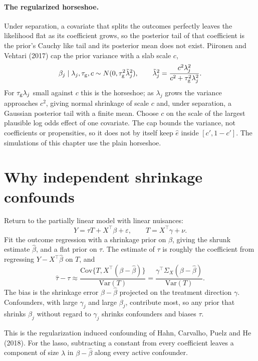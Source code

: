 \paragraph{The regularized horseshoe.} Under separation, a covariate that splits the outcomes perfectly leaves the likelihood flat as its coefficient grows, so the posterior tail of that coefficient is the prior's Cauchy like tail and its posterior mean does not exist. Piironen and Vehtari (2017) cap the prior variance with a slab scale $c$,
\[
\beta_j \mid \lambda_j, \tau_{\mathrm{g}}, c \sim N(0, \tau_{\mathrm{g}}^2\tilde\lambda_j^2), \qquad \tilde\lambda_j^2 = \frac{c^2\lambda_j^2}{c^2 + \tau_{\mathrm{g}}^2\lambda_j^2}.
\]
For $\tau_{\mathrm{g}}\lambda_j$ small against $c$ this is the horseshoe; as $\lambda_j$ grows the variance approaches $c^2$, giving normal shrinkage of scale $c$ and, under separation, a Gaussian posterior tail with a finite mean. Choose $c$ on the scale of the largest plausible log odds effect of one covariate. The cap bounds the variance, not coefficients or propensities, so it does not by itself keep $\hat e$ inside $[c', 1 - c']$. The simulations of this chapter use the plain horseshoe.

\section{Why independent shrinkage confounds}

Return to the partially linear model with linear nuisances:
\[
Y = \tau T + X^\top\beta + \varepsilon, \qquad T = X^\top\gamma + \nu.
\]
Fit the outcome regression with a shrinkage prior on $\beta$, giving the shrunk estimate $\hat\beta$, and a flat prior on $\tau$. The estimate of $\tau$ is roughly the coefficient from regressing $Y - X^\top\hat\beta$ on $T$, and
\[
\hat\tau - \tau \approx \frac{\mathrm{Cov}\{T, X^\top(\beta - \hat\beta)\}}{\mathrm{Var}(T)} = \frac{\gamma^\top \Sigma_X (\beta - \hat\beta)}{\mathrm{Var}(T)}.
\]
The bias is the shrinkage error $\beta - \hat\beta$ projected on the treatment direction $\gamma$. Confounders, with large $\gamma_j$ and large $\beta_j$, contribute most, so any prior that shrinks $\beta_j$ without regard to $\gamma_j$ shrinks confounders and biases $\tau$.

This is the regularization induced confounding of Hahn, Carvalho, Puelz and He (2018). For the lasso, subtracting a constant from every coefficient leaves a component of size $\lambda$ in $\beta - \hat\beta$ along every active confounder. 

